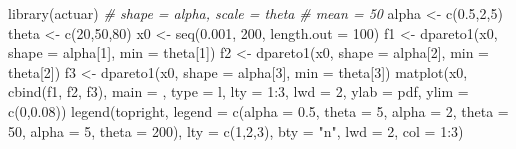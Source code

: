 \documentclass[
]{book}
\newenvironment{Shaded}{\begin{snugshade}}{\end{snugshade}}
\newcommand{\AttributeTok}[1]{\textcolor[rgb]{0.77,0.63,0.00}{#1}}
\newcommand{\CommentTok}[1]{\textcolor[rgb]{0.56,0.35,0.01}{\textit{#1}}}
\newcommand{\DecValTok}[1]{\textcolor[rgb]{0.00,0.00,0.81}{#1}}
\newcommand{\FloatTok}[1]{\textcolor[rgb]{0.00,0.00,0.81}{#1}}
\newcommand{\FunctionTok}[1]{\textcolor[rgb]{0.00,0.00,0.00}{#1}}
\newcommand{\NormalTok}[1]{#1}
\newcommand{\OtherTok}[1]{\textcolor[rgb]{0.56,0.35,0.01}{#1}}
\newcommand{\SpecialCharTok}[1]{\textcolor[rgb]{0.00,0.00,0.00}{#1}}
\newcommand{\StringTok}[1]{\textcolor[rgb]{0.31,0.60,0.02}{#1}}
\begin{document}
\begin{Shaded}
\begin{Highlighting}[]
\FunctionTok{library}\NormalTok{(actuar)}
\CommentTok{\# shape = alpha, scale = theta}
\CommentTok{\# mean = 50}
\NormalTok{alpha }\OtherTok{\textless{}{-}} \FunctionTok{c}\NormalTok{(}\FloatTok{0.5}\NormalTok{,}\DecValTok{2}\NormalTok{,}\DecValTok{5}\NormalTok{)              }
\NormalTok{theta }\OtherTok{\textless{}{-}} \FunctionTok{c}\NormalTok{(}\DecValTok{20}\NormalTok{,}\DecValTok{50}\NormalTok{,}\DecValTok{80}\NormalTok{)     }
\NormalTok{x0 }\OtherTok{\textless{}{-}} \FunctionTok{seq}\NormalTok{(}\FloatTok{0.001}\NormalTok{, }\DecValTok{200}\NormalTok{, }\AttributeTok{length.out =} \DecValTok{100}\NormalTok{)}
\NormalTok{f1 }\OtherTok{\textless{}{-}} \FunctionTok{dpareto1}\NormalTok{(x0,  }\AttributeTok{shape =}\NormalTok{ alpha[}\DecValTok{1}\NormalTok{], }\AttributeTok{min =}\NormalTok{ theta[}\DecValTok{1}\NormalTok{])}
\NormalTok{f2 }\OtherTok{\textless{}{-}} \FunctionTok{dpareto1}\NormalTok{(x0,  }\AttributeTok{shape =}\NormalTok{ alpha[}\DecValTok{2}\NormalTok{], }\AttributeTok{min =}\NormalTok{ theta[}\DecValTok{2}\NormalTok{])}
\NormalTok{f3 }\OtherTok{\textless{}{-}} \FunctionTok{dpareto1}\NormalTok{(x0,  }\AttributeTok{shape =}\NormalTok{ alpha[}\DecValTok{3}\NormalTok{], }\AttributeTok{min =}\NormalTok{ theta[}\DecValTok{3}\NormalTok{])}
\FunctionTok{matplot}\NormalTok{(x0, }\FunctionTok{cbind}\NormalTok{(f1, f2, f3), }\AttributeTok{main =} \StringTok{\textquotesingle{}\textquotesingle{}}\NormalTok{,  }\AttributeTok{type =} \StringTok{\textquotesingle{}l\textquotesingle{}}\NormalTok{, }
        \AttributeTok{lty =} \DecValTok{1}\SpecialCharTok{:}\DecValTok{3}\NormalTok{, }\AttributeTok{lwd =} \DecValTok{2}\NormalTok{, }\AttributeTok{ylab =} \StringTok{\textquotesingle{}pdf\textquotesingle{}}\NormalTok{, }\AttributeTok{ylim =} \FunctionTok{c}\NormalTok{(}\DecValTok{0}\NormalTok{,}\FloatTok{0.08}\NormalTok{))}
\FunctionTok{legend}\NormalTok{(}\StringTok{\textquotesingle{}topright\textquotesingle{}}\NormalTok{, }\AttributeTok{legend =} \FunctionTok{c}\NormalTok{(}\StringTok{\textquotesingle{}alpha = 0.5, theta = 5\textquotesingle{}}\NormalTok{, }
                              \StringTok{\textquotesingle{}alpha = 2, theta = 50\textquotesingle{}}\NormalTok{, }
                              \StringTok{\textquotesingle{}alpha = 5, theta = 200\textquotesingle{}}\NormalTok{),}
       \AttributeTok{lty =} \FunctionTok{c}\NormalTok{(}\DecValTok{1}\NormalTok{,}\DecValTok{2}\NormalTok{,}\DecValTok{3}\NormalTok{), }\AttributeTok{bty =} \StringTok{"n"}\NormalTok{, }\AttributeTok{lwd =} \DecValTok{2}\NormalTok{,  }\AttributeTok{col =} \DecValTok{1}\SpecialCharTok{:}\DecValTok{3}\NormalTok{)}
\end{Highlighting}
\end{Shaded}
\end{document}
